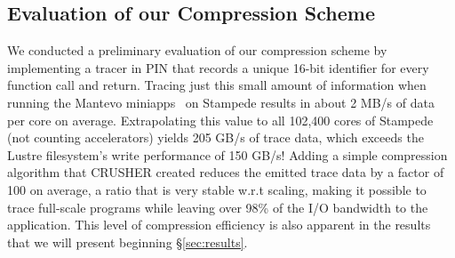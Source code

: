 \subsection{Evaluation of our Compression Scheme}

We conducted a preliminary evaluation of our compression
scheme by implementing a tracer in PIN that
records a unique 16-bit identifier for every function call and
return. 
%
Tracing just this small amount of information when running the
Mantevo miniapps~\cite{mantevo} on Stampede results in about 2 MB/s of
data per core on average. Extrapolating this value to all 102,400
cores of Stampede (not counting accelerators) yields 205 GB/s of trace
data, which exceeds the Lustre filesystem's write performance of 150
GB/s! 
%
Adding a simple compression algorithm that CRUSHER created 
reduces the emitted trace data by a factor of 100 on average,
a ratio that is very stable w.r.t scaling, making it possible to trace
full-scale programs while leaving over 98\% of the I/O bandwidth to
the application. 
%
This level of compression efficiency is also apparent in the 
results that we will present beginning \S\ref{sec:results}.


